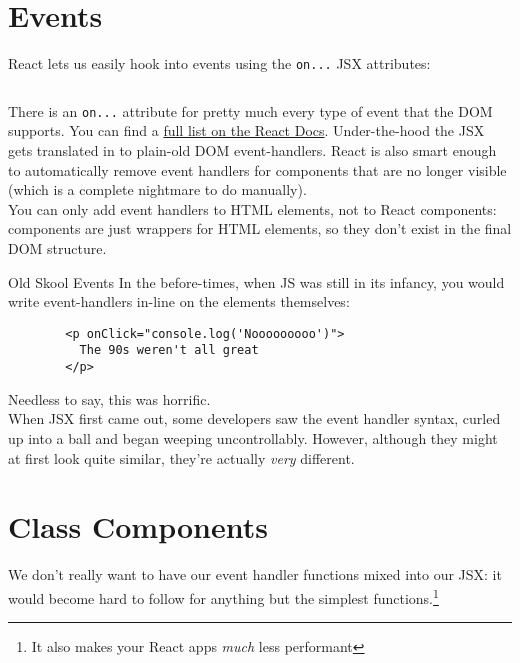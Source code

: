\section{Events}

React lets us easily hook into events using the \texttt{on...} JSX attributes:

\inputminted{jsx}{02/figures/01/01-onClick.jsx}

There is an \texttt{on...} attribute for pretty much every type of event that the DOM supports. You can find a \href{https://facebook.github.io/react/docs/events.html#supported-events}{full list on the React Docs}. Under-the-hood the JSX gets translated in to plain-old DOM event-handlers. React is also smart enough to automatically remove event handlers for components that are no longer visible (which is a complete nightmare to do manually).
\\

You can only add event handlers to HTML elements, not to React components: components are just wrappers for HTML elements, so they don't exist in the final DOM structure.

\begin{infobox}{Old Skool Events}
    In the before-times, when JS was still in its infancy, you would write event-handlers in-line on the elements themselves:

    \begin{verbatim}
        <p onClick="console.log('Nooooooooo')">
          The 90s weren't all great
        </p>
    \end{verbatim}

    Needless to say, this was horrific.
    \\

    When JSX first came out, some developers saw the event handler syntax, curled up into a ball and  began weeping uncontrollably. However, although they might at first look quite similar, they're actually \textit{very} different.
\end{infobox}



\section{Class Components}

We don't really want to have our event handler functions mixed into our JSX: it would become hard to follow for anything but the simplest functions.\footnote{It also makes your React apps \textit{much} less performant}
\\


